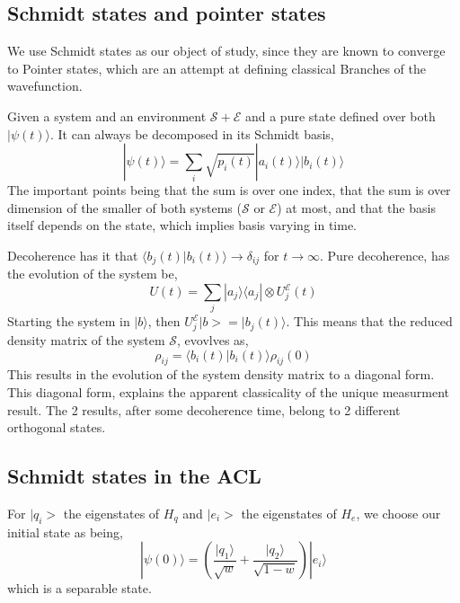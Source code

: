 \documentclass{article}
\begin{document}
\subsection{Schmidt states and pointer states}

We use Schmidt states as our object of study, since they are known to converge to Pointer states, which are an attempt at defining classical Branches of the wavefunction.

Given a system and an environment $\mathcal{S} + \mathcal{E}$ and a pure state defined over both $|\psi(t)\rangle$. It can always be decomposed in its Schmidt basis,
\begin{equation}
    |\psi(t)\rangle = \sum_i \sqrt{p_i(t)}|a_i(t)\rangle|b_i(t)\rangle
\end{equation}
The important points being that the sum is over one index, that the sum is over dimension of the smaller of both systems ($\mathcal{S}$ or $\mathcal{E}$) at most, and that the basis itself depends on the state, which implies basis varying in time.

Decoherence has it that $\langle b_j(t)|b_i(t)\rangle\rightarrow \delta_{ij}$ for $t\rightarrow \infty$. 
Pure decoherence, has the evolution of the system be,
\begin{equation}
    U(t)=\sum_j|a_j\rangle\langle a_j|\otimes U^{\mathcal{E}}_j(t)
\end{equation}
Starting the system in $|b\rangle$, then $U_j^{\mathcal{E}}|b>=|b_j(t)\rangle$. This means that the reduced density matrix of the system $\mathcal{S}$, evovlves as,
\begin{equation}
    \rho_{ij} = \langle b_i(t)|b_i(t)\rangle \rho_{ij}(0)
\end{equation}
This results in the evolution of the system density matrix to a diagonal form. This diagonal form, explains the apparent classicality of the unique measurment result. The 2 results, after some decoherence time, belong to 2 different orthogonal states. 

\subsection{Schmidt states in the ACL}

For $|q_i>$ the eigenstates of $H_q$ and $|e_i>$ the eigenstates of $H_e$, we choose our initial state as being,
\begin{equation}
    |\psi(0)\rangle=(\frac{|q_1\rangle}{\sqrt{w}}+\frac{|q_2\rangle}{\sqrt{1-w}})|e_i\rangle
\end{equation}
which is a separable state.
\end{document}
